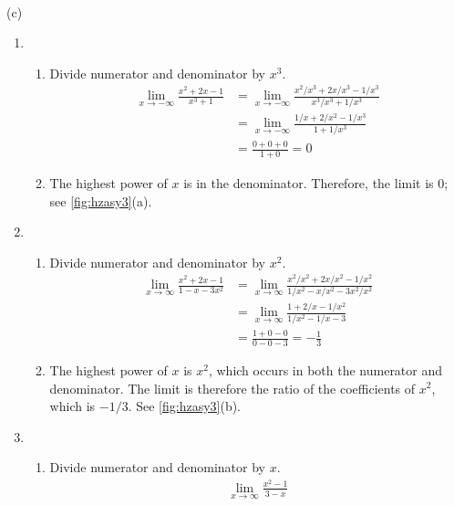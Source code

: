 \begin{example}
{
\\ (c)}
%
\begin{enumerate}
	\item	\begin{enumerate}
		\item Divide numerator and denominator by $x^3$.
			\begin{align*}
				\lim_{x\to -\infty} \frac{x^2+2x-1}{x^3+1}
				&= \lim_{x\to -\infty} \frac{x^2/x^3+2x/x^3-1/x^3}{x^3/x^3+1/x^3}\\
				&=\lim_{x\to -\infty} \frac{1/x+2/x^2-1/x^3}{1+1/x^3}\\
				&=\frac{0+0+0}{1+0}=0
			\end{align*}
		\item The highest power of $x$ is in the denominator.  Therefore, the limit is 0; see \autoref{fig:hzasy3}(a).
		\end{enumerate}
	\item	\begin{enumerate}
		\item Divide numerator and denominator by $x^2$.
			\begin{align*}
				\lim_{x\to \infty} \frac{x^2+2x-1}{1-x-3x^2}
				&=\lim_{x\to\infty}
				\frac{x^2/x^2+2x/x^2-1/x^2}{1/x^2-x/x^2-3x^2/x^2}\\
				&=\lim_{x\to \infty} \frac{1+2/x-1/x^2}{1/x^2-1/x-3}\\
				&=\frac{1+0-0}{0-0-3}=-\frac{1}{3}
			\end{align*}
		\item The highest power of $x$ is $x^2$, which occurs in both the numerator and denominator.  The limit is therefore the ratio of the coefficients of $x^2$, which is $-1/3$. See \autoref{fig:hzasy3}(b).
		\end{enumerate}
	\item	\begin{enumerate}
		\item Divide numerator and denominator by $x$.
			\begin{align*}
				\lim_{x\to\infty}\frac{x^2-1}{3-x}

\end{align*}
\end{enumerate}
\end{enumerate}
\end{example}

